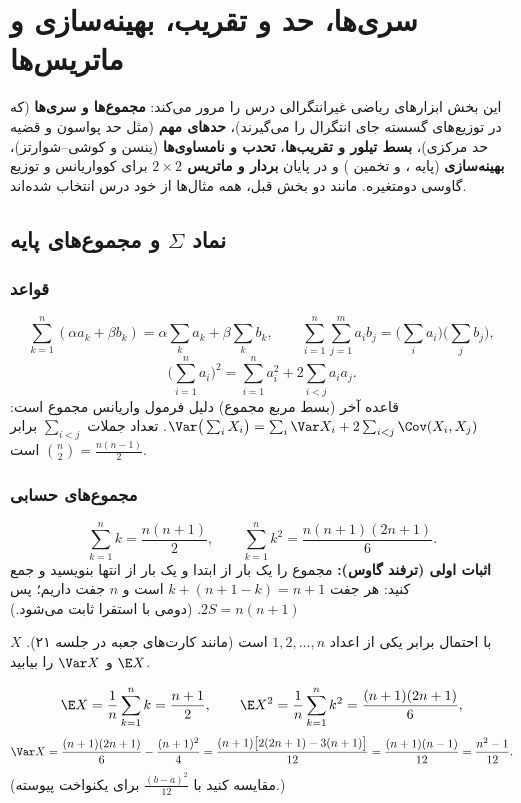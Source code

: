 \chapter{سری‌ها، حد و تقریب، بهینه‌سازی و ماتریس‌ها}

این بخش ابزارهای ریاضی غیرانتگرالی درس را مرور می‌کند: \textbf{مجموع‌ها و سری‌ها} (که در توزیع‌های گسسته جای انتگرال را می‌گیرند)، \textbf{حدهای مهم} (مثل حد پواسون و قضیه حد مرکزی)، \textbf{بسط تیلور و تقریب‌ها}، \textbf{تحدب و نامساوی‌ها} (ینسن و کوشی--شوارتز)، \textbf{بهینه‌سازی} (پایه ،  و تخمین ) و در پایان \textbf{بردار و ماتریس $2\times2$} برای کوواریانس و توزیع گاوسی دومتغیره. مانند دو بخش قبل، همه مثال‌ها از خود درس انتخاب شده‌اند.

\section{نماد $\Sigma$ و مجموع‌های پایه}

\subsection{قواعد}
\[
\sum_{k=1}^n(\alpha a_k+\beta b_k)=\alpha\sum_ka_k+\beta\sum_kb_k,\qquad
\sum_{i=1}^n\sum_{j=1}^ma_ib_j=\Big(\sum_ia_i\Big)\Big(\sum_jb_j\Big),
\]
\[
\Big(\sum_{i=1}^na_i\Big)^2=\sum_{i=1}^na_i^2+2\sum_{i<j}a_ia_j .
\]
قاعده آخر (بسط مربع مجموع) دلیل فرمول واریانس مجموع است: $\Var\big(\sum_iX_i\big)=\sum_i\Var X_i+2\sum_{i<j}\Cov(X_i,X_j)$. تعداد جملات $\sum_{i<j}$ برابر $\binom n2=\frac{n(n-1)}{2}$ است.

\subsection{مجموع‌های حسابی}
\[
\sum_{k=1}^nk=\frac{n(n+1)}{2},\qquad\sum_{k=1}^nk^2=\frac{n(n+1)(2n+1)}{6}.
\]
\textbf{اثبات اولی (ترفند گاوس):} مجموع را یک بار از ابتدا و یک بار از انتها بنویسید و جمع کنید: هر جفت $k+(n+1-k)=n+1$ است و $n$ جفت داریم؛ پس $2S=n(n+1)$. (دومی با استقرا ثابت می‌شود.)

\begin{example}
$X$ با احتمال برابر یکی از اعداد $1,2,\ldots,n$ است (مانند کارت‌های جعبه در جلسه ۲۱). $\E X$ و $\Var X$ را بیابید.
\begin{solution}
\[
\E X=\frac1n\sum_{k=1}^nk=\frac{n+1}{2},\qquad\E X^2=\frac1n\sum_{k=1}^nk^2=\frac{(n+1)(2n+1)}{6},
\]
\[
\Var X=\frac{(n+1)(2n+1)}{6}-\frac{(n+1)^2}{4}=\frac{(n+1)\big[2(2n+1)-3(n+1)\big]}{12}=\frac{(n+1)(n-1)}{12}=\frac{n^2-1}{12}.
\]
(مقایسه کنید با $\frac{(b-a)^2}{12}$ برای یکنواخت پیوسته.)
\end{solution}
\end{example}

